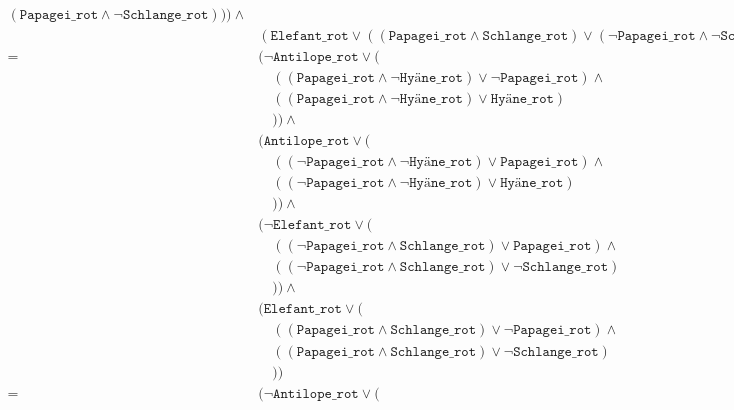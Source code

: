 \documentclass[a4paper,draft=false,oneside,12pt,ngerman]{scrreprt}
\begin{document}
\begin{align*}
                (\texttt{Papagei\_rot} \land \neg \texttt{Schlange\_rot})
                )
            ) \land \\ &
            (\texttt{Elefant\_rot} \lor (
                (\texttt{Papagei\_rot} \land \texttt{Schlange\_rot}) \lor
                (\neg \texttt{Papagei\_rot} \land \neg \texttt{Schlange\_rot})
                )
            ) \\
        =\, & 
            (\neg \texttt{Antilope\_rot} \lor ( \\ & \quad
                ((\texttt{Papagei\_rot} \land \neg \texttt{Hyäne\_rot}) \lor
                    \neg \texttt{Papagei\_rot}) \land \\ & \quad
                ((\texttt{Papagei\_rot} \land \neg \texttt{Hyäne\_rot}) \lor
                    \texttt{Hyäne\_rot}) \\ & \quad
                )
            ) \land \\ &
            (\texttt{Antilope\_rot} \lor ( \\ & \quad
                ((\neg \texttt{Papagei\_rot} \land \neg\texttt{Hyäne\_rot}) \lor
                    \texttt{Papagei\_rot}) \land \\ & \quad
                ((\neg \texttt{Papagei\_rot} \land \neg\texttt{Hyäne\_rot}) \lor
                    \texttt{Hyäne\_rot}) \\ & \quad
                )
            ) \land \\ &
            (\neg \texttt{Elefant\_rot} \lor ( \\ & \quad
                ((\neg \texttt{Papagei\_rot} \land \texttt{Schlange\_rot}) \lor
                    \texttt{Papagei\_rot}) \land \\ & \quad
                ((\neg \texttt{Papagei\_rot} \land \texttt{Schlange\_rot}) \lor
                    \neg \texttt{Schlange\_rot}) \\ & \quad
                )
            ) \land \\ &
            (\texttt{Elefant\_rot} \lor ( \\ & \quad
                ((\texttt{Papagei\_rot} \land \texttt{Schlange\_rot}) \lor
                    \neg \texttt{Papagei\_rot}) \land \\ & \quad
                ((\texttt{Papagei\_rot} \land \texttt{Schlange\_rot}) \lor
                    \neg \texttt{Schlange\_rot}) \\ & \quad
                )
            ) \\
        =\, & 
            (\neg \texttt{Antilope\_rot} \lor ( \\ & \quad

\end{align*}
\end{document}
